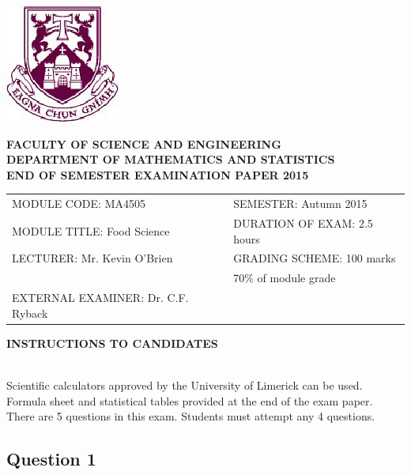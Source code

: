 \documentclass[a4paper,12pt]{article}
\begin{document}
\begin{center}
       \includegraphics[scale=0.55]{images/shieldtransparent2}
\end{center}

\begin{center}
\vspace{1cm}
\large \bf {FACULTY OF SCIENCE AND ENGINEERING} \\[0.5cm]
\normalsize DEPARTMENT OF MATHEMATICS AND STATISTICS \\[1.25cm]
\large \bf {END OF SEMESTER EXAMINATION PAPER 2015} \\[1.5cm]
\end{center}

\begin{tabular}{ll}
MODULE CODE: MA4505 & SEMESTER: Autumn 2015 \\[1cm]
MODULE TITLE: Food Science & DURATION OF EXAM: 2.5 hours  \\[1cm]
LECTURER: Mr. Kevin O'Brien & GRADING SCHEME: 100 marks \\
& \phantom{GRADING SCHEME:} \footnotesize {70\% of module grade} \\[1cm]
EXTERNAL EXAMINER: Dr. C.F. Ryback  &  \\[1cm]

\end{tabular}
\vspace{-0.5cm}
\begin{center}
{\bf INSTRUCTIONS TO CANDIDATES}
\end{center}

{\noindent \\ Scientific calculators approved by the University of Limerick can be used. \\
Formula sheet and statistical tables provided at the end of the exam paper.\\
There are 5 questions in this exam. Students must attempt any 4 questions.}
\newpage
\subsection*{Question 1}
\end{document}
